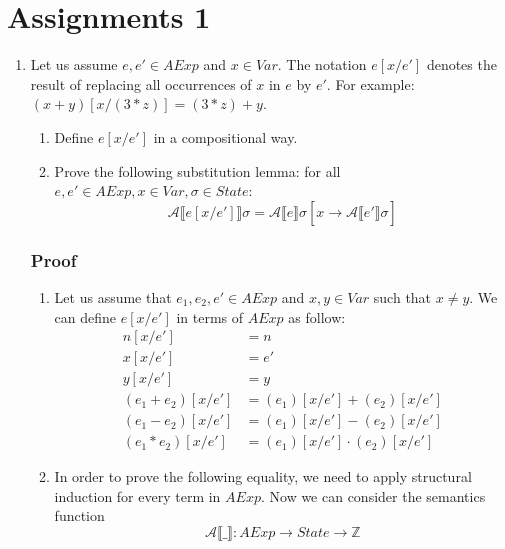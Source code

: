 \documentclass{article}
\title{}
\date{}
\author{Rafael Fernández Ortiz}
\begin{document}
\maketitle

\section*{Assignments 1}
\begin{enumerate}
\item Let us assume $e,e' \in AExp$ and $x\in Var$. The notation $e[x/e']$ denotes the result of replacing all occurrences of $x$ in $e$ by $e'$. For example: $(x+y)[x/(3*z)] = (3*z)+y$.
    \begin{enumerate}
        \item Define $e[x/e']$ in a compositional way.
        \item Prove the following substitution lemma: for all $e,e' \in AExp, x\in Var, \sigma \in State$:
        $$\mathcal{A}\llbracket e[x/e'] \rrbracket \sigma = \mathcal{A}\llbracket e \rrbracket \sigma [x \xrightarrow[]{}\mathcal{A} \llbracket e'\rrbracket\sigma]$$
    \end{enumerate}
\subsubsection*{Proof}
    \begin{enumerate}
        \item Let us assume that $e_{1}, e_{2}, e' \in AExp$ and $x, y \in Var$ such that $x \neq y$. We can define  $e[x/e']$ in terms of $AExp$ as follow:
        \begin{align*}
        n[x/e'] &= n \\
        x[x/e'] &= e' \\
        y[x/e'] &= y \\
        (e_1 + e_2)[x/e'] &= (e_1)[x/e'] + (e_2)[x/e'] \\
        (e_1 - e_2)[x/e'] &= (e_1)[x/e'] - (e_2)[x/e'] \\
        (e_1 * e_2)[x/e'] &= (e_1)[x/e'] \cdot (e_2)[x/e']
        \end{align*}
        
        \item In order to prove the following equality, we need to apply structural induction for every term in $AExp$. Now we can consider the semantics function $$\mathcal{A}\llbracket \_ \rrbracket : AExp \longrightarrow State \longrightarrow \mathbb Z $$
        

\end{enumerate}
\end{enumerate}
\end{document}
